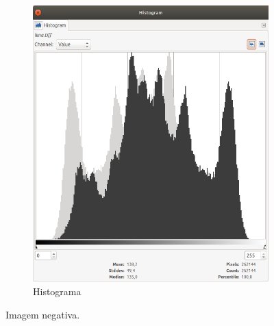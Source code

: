 \begin{figure}[!h]
\begin{subfigure}{\figw}
            \includegraphics[scale=\scaleh]{images/03/hist_lena_neg.png}
            \caption{\label{fig:lena_neg:hist} Histograma}
        \end{subfigure}

    \caption{\label{fig:lena_neg} Imagem negativa.}
\end{figure}

